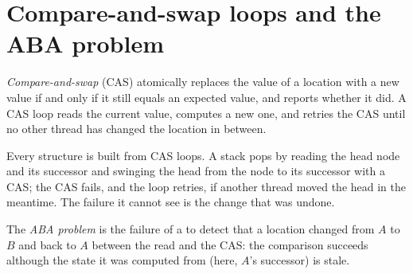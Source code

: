 \section{Compare-and-swap loops and the ABA problem}

\begin{definition}\label{def:ll:lock-free-programming:cas}
\emph{Compare-and-swap} (CAS) atomically replaces the value of a location with a new value if and
only if it still equals an expected value, and reports whether it did. A CAS loop reads the current value, computes a new
one, and retries the CAS until no other thread has changed the location in between.
\end{definition}

Every  structure is built from CAS loops. A stack pops by reading the head node and its successor and swinging
the head from the node to its successor with a CAS; the CAS fails, and the loop retries, if another thread moved the head
in the meantime. The failure it cannot see is the change that was undone.

\begin{definition}\label{def:ll:lock-free-programming:aba}
The \emph{ABA problem} is the failure of a  to detect that a location changed from
$A$ to $B$ and back to $A$ between the read and the CAS: the comparison succeeds although the state it was computed from
(here, $A$'s successor) is stale.
\end{definition}

